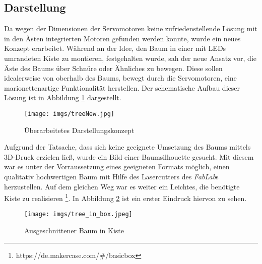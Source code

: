 \documentclass[.../Dokumentation.tex]{subfiles}
\begin{document}
\subsection{Darstellung}\label{sec-ita3-visualization}
Da wegen der Dimensionen der Servomotoren keine zufriedenstellende Lösung 
mit in den Ästen integrierten Motoren gefunden werden konnte, wurde ein neues 
Konzept erarbeitet.
Während an der Idee, den Baum in einer mit LEDs umrandeten Kiste zu montieren, 
festgehalten wurde, sah der neue Ansatz vor, die Äste des Baums über Schnüre 
oder Ähnliches zu bewegen.
Diese sollen idealerweise von oberhalb des Baums, bewegt durch die Servomotoren, 
eine marionettenartige Funktionalität herstellen.
Der schematische Aufbau dieser Lösung ist in Abbildung \ref{fig-treeNew} 
dargestellt.
\begin{figure}[H]
\begin{center}
    \texttt{[image: imgs/treeNew.jpg]}
    \caption{Überarbeitetes Darstellungskonzept}
    \label{fig-treeNew}
\end{center}
\end{figure}
\noindent
Aufgrund der Tatsache, dass sich keine geeignete Umsetzung des Baums  
mittels 3D-Druck erzielen ließ, wurde ein Bild einer Baumsilhouette gesucht.
Mit diesem war es unter der Vorraussetzung eines geeigneten Formats möglich, 
einen qualitativ 
hochwertigen Baum mit Hilfe des Lasercutters des \textit{FabLab}s herzustellen.
Auf dem gleichen Weg war es weiter ein Leichtes, die benötigte Kiste zu 
realisieren \footnote{https://de.makercase.com/\#/basicbox}.
In Abbildung \ref{fig-tree-in-box} ist ein erster Eindruck hiervon zu sehen.
\begin{figure}[H]
\begin{center}
    \texttt{[image: imgs/tree\_in\_box.jpeg]}
    \caption{Ausgeschnittener Baum in Kiste}
    \label{fig-tree-in-box}
\end{center}
\end{figure}
\end{document}
